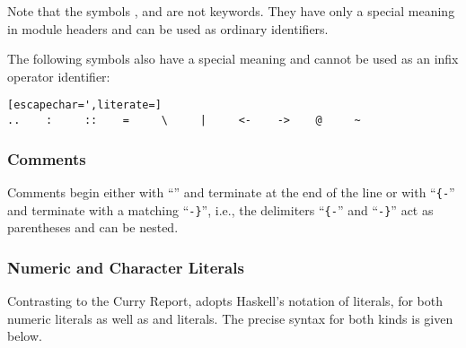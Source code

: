 Note that the symbols , 
and  are not keywords.
They have only a special meaning in module headers
and can be used as ordinary identifiers.

The following symbols also have a special meaning and cannot
be used as an infix operator identifier:
\begin{lstlisting}[escapechar=',literate=]
..    :     ::    =     \     |     <-    ->    @     ~
\end{lstlisting}

\subsubsection{Comments}

Comments begin either with ``\term{--}'' and terminate at the end of the line
or with ``\verb|{-|'' and terminate with a matching ``\verb|-}|'', i.e.,
the delimiters ``\verb|{-|'' and ``\verb|-}|''
act as parentheses and can be nested.

\subsubsection{Numeric and Character Literals}

Contrasting to the Curry Report, \CYS adopts Haskell's notation of literals,
for both numeric literals as well as  and  literals.
The precise syntax for both kinds is given below.

